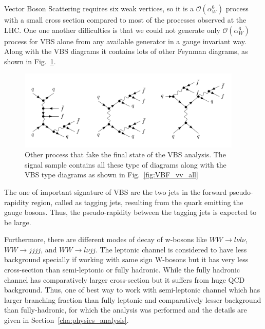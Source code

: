 Vector Boson Scattering requires six weak vertices, so it is a $\mathcal{O}(\alpha^6_W)$ process with a small cross section compared to most of the processes observed at the LHC. One one another difficulties is that we could not generate only $\mathcal{O}(\alpha^6_W)$ process for VBS alone from any available generator in a gauge invariant way. Along with the VBS diagrams it contains lots of other Feynman diagrams, as shown in Fig.~\ref{fig:non-vbs}.
\begin{figure}[htbp]
    \centering
    \includegraphics[width=0.95\textwidth]{Pictures/non-vbs.png}
    \caption{Other process that fake the final state of the VBS analysis. The signal sample contains all these type of diagrams along with the VBS type diagrams as shown in Fig.~\ref{fig:VBF_vv_all}}
    \label{fig:non-vbs}
\end{figure}


The one of important signature of VBS are the two jets in the forward pseudo-rapidity region, called as tagging jets, resulting from the quark emitting the gauge bosons. Thus, the pseudo-rapidity between the tagging jets is expected to be large.

Furthermore, there are different modes of decay of w-bosons like $WW \rightarrow l \nu l\nu $, $WW \rightarrow jj jj $, and $WW \rightarrow l \nu jj$. The leptonic channel is considered to have less background specially if working with same sign W-bosons but it has very less cross-section than semi-leptonic or fully hadronic. While the fully hadronic channel has comparatively larger cross-section but it suffers from huge QCD background. Thus, one of best way to work with semi-leptonic channel which has larger branching fraction than fully leptonic and comparatively lesser background than fully-hadronic, for which the analysis was performed and the details are given in Section~\ref{cha:physics_analysis}.


